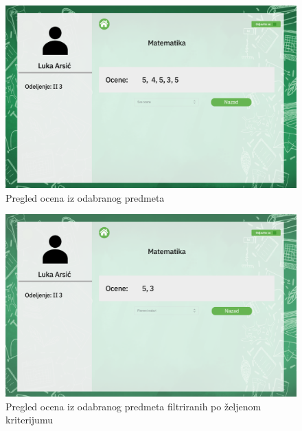\documentclass{article}
\begin{document}
\begin{figure} [!ht]
    \begin{center}
        \includegraphics[scale=0.22]{../UI/Ucenik/Student_subject_math.png}
    \end{center}
\caption{Pregled ocena iz odabranog predmeta}
\end{figure}

\begin{figure} [!ht]
    \begin{center}
        \includegraphics[scale=0.22]{../UI/Ucenik/Student_subject_math_exam.png}
    \end{center}
\caption{Pregled ocena iz odabranog predmeta filtriranih po željenom kriterijumu}
\end{figure}
\end{document}
